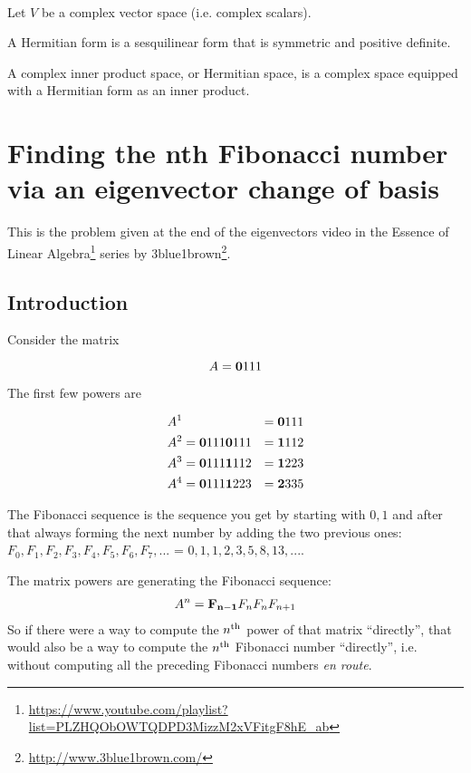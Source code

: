 \begin{definition*}~\\
  Let $V$ be a complex vector space (i.e. complex scalars).

  A Hermitian form is a sesquilinear form that is symmetric and positive definite.

  A complex inner product space, or Hermitian space, is a complex space equipped with a Hermitian
  form as an inner product.
\end{definition*}


\section{Finding the nth Fibonacci number via an eigenvector change of basis}


This is the problem given at the end of the eigenvectors video in the
Essence of Linear Algebra\footnote{\url{https://www.youtube.com/playlist?list=PLZHQObOWTQDPD3MizzM2xVFitgF8hE_ab}}
series by 3blue1brown\footnote{\url{http://www.3blue1brown.com/}}.


\subsection*{Introduction}

Consider the matrix

$$
A = \mathbf{0}{1}
        {1}{1}
$$

The first few powers are

\begin{align*}
&A^{1} &= \mathbf{0}{1}
              {1}{1}
\\
&A^{2} = \mathbf{0}{1}
             {1}{1} \mathbf{0}{1}
                        {1}{1} &= \mathbf{1}{1}
                                      {1}{2}
\\
&A^{3} = \mathbf{0}{1}
             {1}{1} \mathbf{1}{1}
                        {1}{2} &= \mathbf{1}{2}
                                      {2}{3}
\\
&A^{4} = \mathbf{0}{1}
             {1}{1} \mathbf{1}{2}
                        {2}{3} &= \mathbf{2}{3}
                                      {3}{5}
\end{align*}

The Fibonacci sequence is the sequence you get by starting with $0,
1$ and after that always forming the next number by adding the two previous ones:
$F_0, F_1, F_2, F_3, F_4, F_5, F_6, F_7, ...$ = $0, 1, 1, 2, 3, 5, 8, 13, ...$.

The matrix powers are generating the Fibonacci sequence:
\begin{align*}
  A^{n} = \mathbf{F_{n-1} }{F_n      }
  {F_n     }{F_{n+1} }
\end{align*}
So if there were a way to compute the $n^{\text{th}}$ power of that matrix ``directly'',
that would also be a way to compute the $n^{\text{th}}$ Fibonacci number ``directly'',
i.e. without computing all the preceding Fibonacci numbers \textit{en route}.

